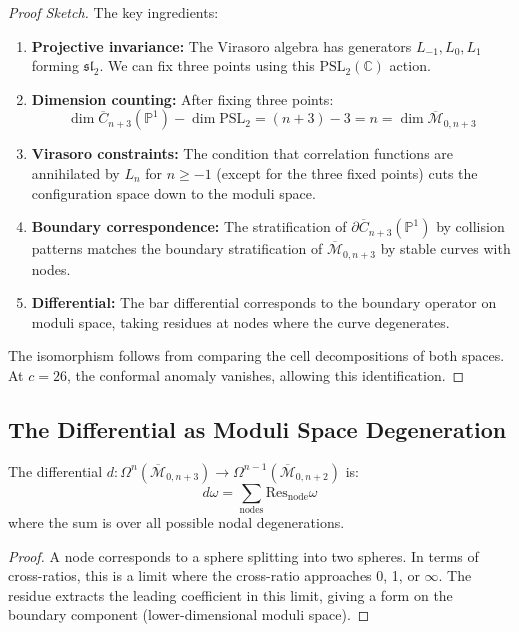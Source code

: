\begin{proof}[Proof Sketch]
The key ingredients:
\begin{enumerate}
\item \textbf{Projective invariance:} The Virasoro algebra has generators $L_{-1}, L_0, L_1$ forming 
$\mathfrak{sl}_2$. We can fix three points using this $\text{PSL}_2(\mathbb{C})$ action.
 
\item \textbf{Dimension counting:} After fixing three points:
\[
\dim \overline{C}_{n+3}(\mathbb{P}^1) - \dim \text{PSL}_2 = (n+3) - 3 = n = \dim \overline{\mathcal{M}}_{0,n+3}
\]
 
\item \textbf{Virasoro constraints:} The condition that correlation functions are annihilated by $L_n$ 
for $n \geq -1$ (except for the three fixed points) cuts the configuration space down to the moduli space.
 
\item \textbf{Boundary correspondence:} The stratification of $\partial\overline{C}_{n+3}(\mathbb{P}^1)$ by 
collision patterns matches the boundary stratification of $\overline{\mathcal{M}}_{0,n+3}$ by stable curves 
with nodes.
 
\item \textbf{Differential:} The bar differential corresponds to the boundary operator on moduli space, 
taking residues at nodes where the curve degenerates.
\end{enumerate}
 
The isomorphism follows from comparing the cell decompositions of both spaces. At $c = 26$, the 
conformal anomaly vanishes, allowing this identification.
\end{proof}
 
\subsection{The Differential as Moduli Space Degeneration}
 
\begin{proposition}
The differential $d: \Omega^n(\overline{\mathcal{M}}_{0,n+3}) \to \Omega^{n-1}(\overline{\mathcal{M}}_{0,n+2})$ is:
\[
d\omega = \sum_{\text{nodes}} \text{Res}_{\text{node}} \omega
\]
where the sum is over all possible nodal degenerations.
\end{proposition}
 
\begin{proof}
A node corresponds to a sphere splitting into two spheres. In terms of cross-ratios, this is a limit 
where the cross-ratio approaches 0, 1, or $\infty$. The residue extracts the leading coefficient in this 
limit, giving a form on the boundary component (lower-dimensional moduli space).
\end{proof}
 
